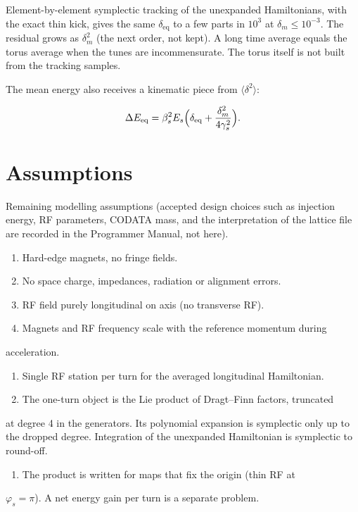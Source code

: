 \documentclass[11pt,a4paper]{article}
\begin{document}
Element-by-element symplectic tracking of the unexpanded Hamiltonians,
with the exact thin kick, gives the same $\delta_{\mathrm{eq}}$ to a
few parts in $10^3$ at $\delta_m\le 10^{-3}$. The residual grows as
$\delta_m^2$ (the next order, not kept). A long time average equals the
torus average when the tunes are incommensurate. The torus itself is not
built from the tracking samples.

The mean energy also receives a kinematic piece from $\langle\delta^2\rangle$:

\[
\Delta E_{\mathrm{eq}}
=\beta_s^2 E_s\Bigl(\delta_{\mathrm{eq}}+\frac{\delta_m^2}{4\gamma_s^2}\Bigr).
\]

\clearpage
\section{Assumptions}

Remaining modelling assumptions (accepted design choices such as injection
energy, RF parameters, CODATA mass, and the interpretation of the lattice
file are recorded in the Programmer Manual, not here).

\begin{enumerate}
\item Hard-edge magnets, no fringe fields.
\item No space charge, impedances, radiation or alignment errors.
\item RF field purely longitudinal on axis (no transverse RF).
\item Magnets and RF frequency scale with the reference momentum during
\end{enumerate}
   acceleration.
\begin{enumerate}
\item Single RF station per turn for the averaged longitudinal Hamiltonian.
\item The one-turn object is the Lie product of Dragt–Finn factors, truncated
\end{enumerate}
   at degree 4 in the generators. Its polynomial expansion is symplectic
   only up to the dropped degree. Integration of the unexpanded
   Hamiltonian is symplectic to round-off.
\begin{enumerate}
\item The product is written for maps that fix the origin (thin RF at
\end{enumerate}
   $\varphi_s=\pi$). A net energy gain per turn is a separate problem.
\end{document}
